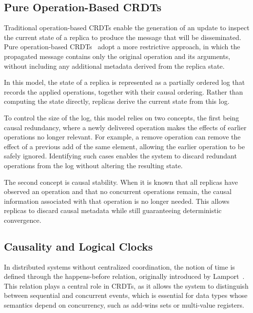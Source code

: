 \subsection{Pure Operation-Based CRDTs}
\label{sub:pure_operation}

Traditional operation-based CRDTs enable the generation of an update to inspect the current state of a replica to produce the message that will be disseminated. Pure operation-based CRDTs~\cite{baquero2017nested} adopt a more restrictive approach, in which the propagated message contains only the original operation and its arguments, without including any additional metadata derived from the replica state.

In this model, the state of a replica is represented as a partially ordered log that records the applied operations, together with their causal ordering. Rather than computing the state directly, replicas derive the current state from this log.

To control the size of the log, this model relies on two concepts, the first being causal redundancy, where a newly delivered operation makes the effects of earlier operations no longer relevant. For example, a remove operation can remove the effect of a previous add of the same element, allowing the earlier operation to be safely ignored. Identifying such cases enables the system to discard redundant operations from the log without altering the resulting state.

The second concept is causal stability. When it is known that all replicas have observed an operation and that no concurrent operations remain, the causal information associated with that operation is no longer needed. This allows replicas to discard causal metadata while still guaranteeing deterministic convergence.

\subsection{Causality and Logical Clocks}
\label{sub:logical_clocks}

In distributed systems without centralized coordination, the notion of time is defined through the happens-before relation, originally introduced by Lamport~\cite{lamport2019clocks}. This relation plays a central role in CRDTs, as it allows the system to distinguish between sequential and concurrent events, which is essential for data types whose semantics depend on concurrency, such as add-wins sets or multi-value registers.

